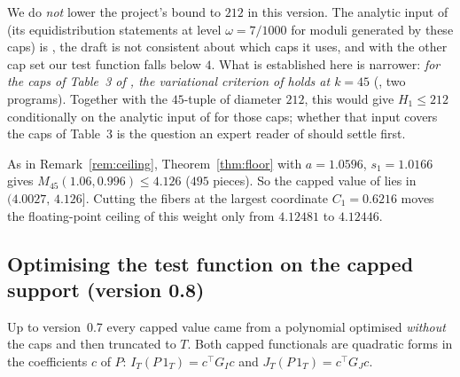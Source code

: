 We do \emph{not} lower the project's bound to $212$ in this version. The
analytic input of \cite{Cha26} (its equidistribution statements at level
$\omega=7/1000$ for moduli generated by these caps) is , the
draft is not consistent about which caps it uses, and with the other cap set
our test function falls below $4$. What is established here is narrower:
\emph{for the caps of Table~3 of \cite{Cha26}, the variational criterion of
\cite[Thm.~4.10]{Cha26} holds at $k=45$} (, two programs).
Together with the  $45$-tuple of diameter $212$, this
would give $H_1\le212$ conditionally on the analytic input of \cite{Cha26}
for those caps; whether that input covers the caps of Table~3 is the question
an expert reader of \cite{Cha26} should settle first.

\begin{remark}[\lbl{Computed}, interval arithmetic: ceiling for $k=45$]\label{rem:ceiling45}
As in Remark~\ref{rem:ceiling}, Theorem~\ref{thm:floor} with $a=1.0596$,
$s_1=1.0166$ gives $M_{45}(1.06,0.996)\le4.126$ ($495$ pieces). So the
capped value of \cite{Cha26} lies in $(4.0027,\,4.126]$. Cutting the fibers at
the largest coordinate $C_1=0.6216$ moves the floating-point ceiling of this
weight only from $4.12481$ to $4.12446$.
\end{remark}

\subsection*{Optimising the test function on the capped support (version 0.8)}
Up to version~0.7 every capped value came from a polynomial optimised
\emph{without} the caps and then truncated to $T$. Both capped functionals
are quadratic forms in the coefficients $c$ of $P$:
$I_T(P\,1_T)=c^{\top}G_Ic$ and $J_T(P\,1_T)=c^{\top}G_Jc$.

